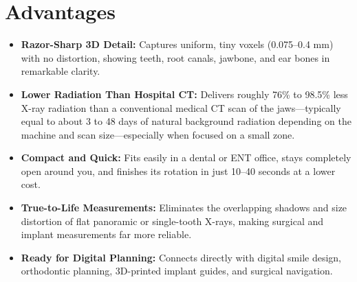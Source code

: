 \section{Advantages}
\begin{itemize}
    \item \textbf{Razor-Sharp 3D Detail:} Captures uniform, tiny voxels (0.075--0.4 mm) with no distortion, showing teeth, root canals, jawbone, and ear bones in remarkable clarity.
    \item \textbf{Lower Radiation Than Hospital CT:} Delivers roughly 76\% to 98.5\% less X-ray radiation than a conventional medical CT scan of the jaws---typically equal to about 3 to 48 days of natural background radiation depending on the machine and scan size---especially when focused on a small zone.
    \item \textbf{Compact and Quick:} Fits easily in a dental or ENT office, stays completely open around you, and finishes its rotation in just 10--40 seconds at a lower cost.
    \item \textbf{True-to-Life Measurements:} Eliminates the overlapping shadows and size distortion of flat panoramic or single-tooth X-rays, making surgical and implant measurements far more reliable.
    \item \textbf{Ready for Digital Planning:} Connects directly with digital smile design, orthodontic planning, 3D-printed implant guides, and surgical navigation.
\end{itemize}

